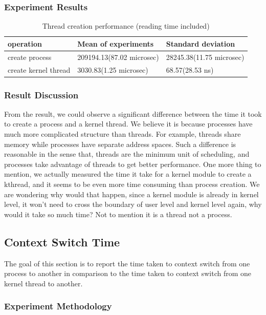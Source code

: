 \documentclass{article} %
\begin{document}
\subsubsection{Experiment Results}
\begin{table}[h]
  \begin{center}
    \caption{Thread creation performance (reading time included)}
    \begin{tabular}{|l|l|l|}
      \hline
      operation            & Mean of experiments       & Standard deviation       \\ \hline
      create process       & 209194.13(87.02 microsec) & 28245.38(11.75 microsec) \\ \hline
      create kernel thread & 3030.83(1.25 microsec)    & 68.57(28.53 ns)          \\ \hline
    \end{tabular}
    \label{table:thread_creating_results}
  \end{center}
\end{table}


\subsubsection{Result Discussion}
From the result, we could observe a significant difference between the time it
took to create a process and a kernel thread. We believe it is because
processes have much more complicated structure than threads. For example,
threads share memory while processes have separate address spaces. Such
a difference is reasonable in the sense that, threads are the minimum unit of
scheduling, and processes take advantage of threads to get better performance.
One more thing to mention, we actually measured the time it take for a kernel
module to create a kthread, and it seems to be even more time consuming than
process creation. We are wondering why would that happen, since a kernel
module is already in kernel level, it won't need to cross the boundary of user
level and kernel level again, why would it take so much time? Not to mention
it is a thread not a process.


\subsection{Context Switch Time}
The goal of this section is to report the time taken to context switch from
one process to another in comparison to the time taken to context switch from
one kernel thread to another.
\subsubsection{Experiment Methodology}
\end{document}
